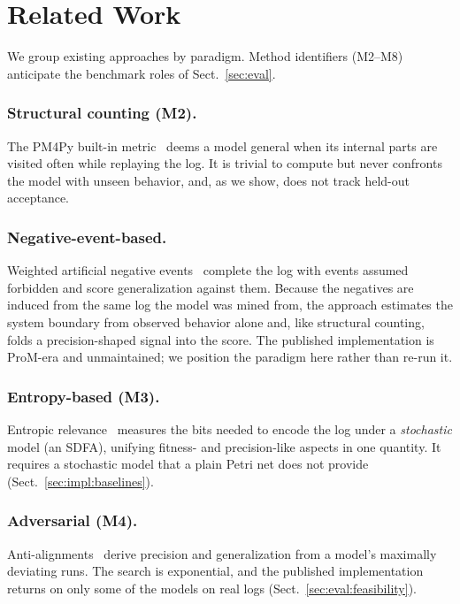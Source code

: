 \documentclass[runningheads]{llncs}
\newcommand{\chg}[1]{\textcolor{chgblue}{#1}}
\begin{document}
\section{Related Work}
\label{sec:related}

We group existing approaches by paradigm. Method identifiers (M2--M8) anticipate the benchmark roles of Sect.~\ref{sec:eval}.

\subsubsection{Structural counting (M2).}
The PM4Py built-in metric~\cite{buijs2014quality,berti2019pm4py} deems a model general when its internal parts are visited often while replaying the log. It is trivial to compute but never confronts the model with unseen behavior, and, as we show, does not track held-out acceptance.

\subsubsection{Negative-event-based.}
\chg{Weighted artificial negative events~\cite{vandenbroucke2014negative} complete the log with events assumed forbidden and score generalization against them. Because the negatives are induced from the same log the model was mined from, the approach estimates the system boundary from observed behavior alone and, like structural counting, folds a precision-shaped signal into the score. The published implementation is ProM-era and unmaintained; we position the paradigm here rather than re-run it.}

\subsubsection{Entropy-based (M3).}
Entropic relevance~\cite{alkhammash2022entropic} measures the bits needed to encode the log under a \emph{stochastic} model (an SDFA), unifying fitness- and precision-like aspects in one quantity. It requires a stochastic model that a plain Petri net does not provide (Sect.~\ref{sec:impl:baselines}).

\subsubsection{Adversarial (M4).}
\chg{Anti-alignments~\cite{vandongen2016anti} derive precision and generalization from a model's maximally deviating runs.} The search is exponential, and the published implementation returns on only some of the models on real logs (Sect.~\ref{sec:eval:feasibility}).
\end{document}
